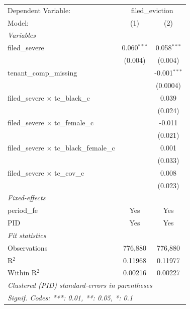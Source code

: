 \par\endgroup
\begingroup
\centering
\begin{tabular}{lcc}
   \tabularnewline \midrule \midrule
   Dependent Variable: & \multicolumn{2}{c}{filed\_eviction}\\
   Model:                                           & (1)           & (2)\\  
   \midrule
   \emph{Variables}\\
   filed\_severe                                    & 0.060$^{***}$ & 0.058$^{***}$\\   
                                                    & (0.004)       & (0.004)\\   
   tenant\_comp\_missing                            &               & -0.001$^{***}$\\   
                                                    &               & (0.0004)\\   
   filed\_severe $\times$ tc\_black\_c              &               & 0.039\\   
                                                    &               & (0.024)\\   
   filed\_severe $\times$ tc\_female\_c             &               & -0.011\\   
                                                    &               & (0.021)\\   
   filed\_severe $\times$ tc\_black\_female\_c      &               & 0.001\\   
                                                    &               & (0.033)\\   
   filed\_severe $\times$ tc\_cov\_c                &               & 0.008\\   
                                                    &               & (0.023)\\   
   \midrule
   \emph{Fixed-effects}\\
   period\_fe                                       & Yes           & Yes\\  
   PID                                              & Yes           & Yes\\  
   \midrule
   \emph{Fit statistics}\\
   Observations                                     & 776,880       & 776,880\\  
   R$^2$                                            & 0.11968       & 0.11977\\  
   Within R$^2$                                     & 0.00216       & 0.00227\\  
   \midrule \midrule
   \multicolumn{3}{l}{\emph{Clustered (PID) standard-errors in parentheses}}\\
   \multicolumn{3}{l}{\emph{Signif. Codes: ***: 0.01, **: 0.05, *: 0.1}}\\
\end{tabular}
